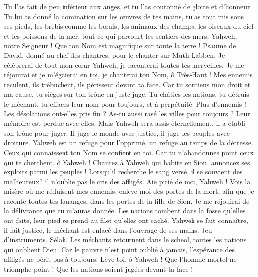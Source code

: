 \begin{multicols}{2}
Tu l'as fait de peu inférieur aux anges, et tu l'as couronné de gloire et d'honneur.
Tu lui as donné la domination sur les œuvres de tes mains, tu as tout mis sous ses pieds,
les brebis comme les bœufs, les animaux des champs,
les oiseaux du ciel et les poissons de la mer, tout ce qui parcourt les sentiers des mers.
Yahweh, notre Seigneur ! Que ton Nom est magnifique sur toute la terre !
\VerseOne{}Psaume de David, donné au chef des chantres, pour le chanter sur Muth-Labben.
Je célébrerai de tout mon cœur Yahweh, je raconterai toutes tes merveilles.
Je me réjouirai et je m'égaierai en toi, je chanterai ton Nom, ô Très-Haut !
Mes ennemis reculent, ils trébuchent, ils périssent devant ta face.
Car tu soutiens mon droit et ma cause, tu sièges sur ton trône en juste juge.
Tu châties les nations, tu détruis le méchant, tu effaces leur nom pour toujours, et à perpétuité.
Plus d'ennemis ! Les désolations ont-elles pris fin ? As-tu aussi rasé les villes pour toujours ? Leur mémoire est perdue avec elles.
Mais Yahweh sera assis éternellement, il a établi son trône pour juger.
Il juge le monde avec justice, il juge les peuples avec droiture.
Yahweh est un refuge pour l'opprimé, un refuge au temps de la détresse.
Ceux qui connaissent ton Nom se confient en toi. Car tu n'abandonnes point ceux qui te cherchent, ô Yahweh !
Chantez à Yahweh qui habite en Sion, annoncez ses exploits parmi les peuples !
Lorsqu'il recherche le sang versé, il se souvient des malheureux? il n'oublie pas le cris des affligés.
Aie pitié de moi, Yahweh ! Vois la misère où me réduisent mes ennemis, enlève-moi des portes de la mort,
afin que je raconte toutes tes louanges, dans les portes de la fille de Sion. Je me réjouirai de la délivrance que tu m'auras donnée.
Les nations tombent dans la fosse qu'elles ont faite, leur pied se prend au filet qu'elles ont caché.
Yahweh se fait connaître, il fait justice, le méchant est enlacé dans l'ouvrage de ses mains. Jeu d'instruments. Sélah.
Les méchants retournent dans le scheol, toutes les nations qui oublient Dieu.
Car le pauvre n'est point oublié à jamais, l'espérance des affligés ne périt pas à toujours.
Lève-toi, ô Yahweh ! Que l'homme mortel ne triomphe point ! Que les nations soient jugées devant ta face !

\end{multicols}
